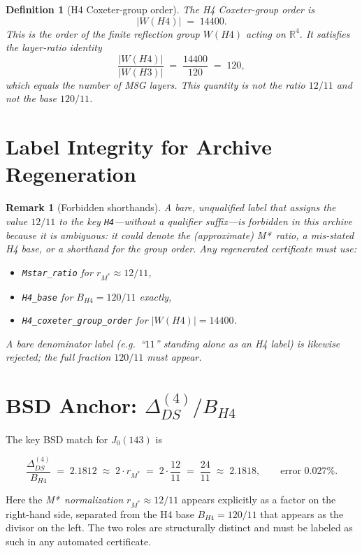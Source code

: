 \documentclass[12pt]{article}
\newtheorem{definition}[theorem]{Definition}
\newtheorem{remark}[theorem]{Remark}
\begin{document}
\begin{definition}[H4 Coxeter-group order]\label{def:h4-order}
The \emph{H4 Coxeter-group order} is
\[
  |W(H4)| \;=\; 14400.
\]
This is the order of the finite reflection group $W(H4)$ acting on
$\mathbb{R}^4$.  It satisfies the layer-ratio identity
\[
  \frac{|W(H4)|}{|W(H3)|} \;=\; \frac{14400}{120} \;=\; 120,
\]
which equals the number of M8G layers.  This quantity is \emph{not}
the ratio $12/11$ and \emph{not} the base $120/11$.
\end{definition}

\section{Label Integrity for Archive Regeneration}

\begin{remark}[Forbidden shorthands]\label{rem:forbidden}
A bare, unqualified label that assigns the value $12/11$ to the key
\texttt{H4}---without a qualifier suffix---is forbidden in this archive
because it is ambiguous: it could denote the (approximate) M*~ratio,
a mis-stated H4 base, or a shorthand for the group order.  Any
regenerated certificate must use:
\begin{itemize}
  \item \texttt{Mstar\_ratio} for $r_{M^*} \approx 12/11$,
  \item \texttt{H4\_base} for $B_{H4} = 120/11$ exactly,
  \item \texttt{H4\_coxeter\_group\_order} for $|W(H4)| = 14400$.
\end{itemize}
A bare denominator label (e.g.\ ``$11$'' standing alone as an H4
label) is likewise rejected; the full fraction $120/11$ must appear.
\end{remark}

\section{BSD Anchor: $\Delta_{DS}^{(4)} / B_{H4}$}

The key BSD match for $J_0(143)$ is

\[
  \frac{\Delta_{DS}^{(4)}}{B_{H4}}
  \;=\; 2.1812
  \;\approx\; 2 \cdot r_{M^*}
  \;=\; 2 \cdot \frac{12}{11}
  \;=\; \frac{24}{11}
  \;\approx\; 2.1818,
  \qquad \text{error } 0.027\%.
\]

Here the \emph{M*~normalization} $r_{M^*} \approx 12/11$ appears
explicitly as a factor on the right-hand side, separated from the
H4 base $B_{H4} = 120/11$ that appears as the divisor on the left.
The two roles are structurally distinct and must be labeled as such in
any automated certificate.
\end{document}
